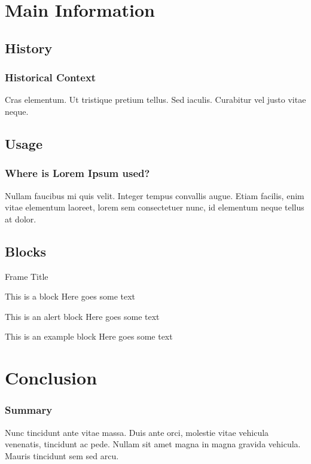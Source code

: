 \documentclass[
	11pt,
	aspectratio=169,
]{beamer}
\begin{document}
\section{Main Information}
\subsection{History}
\begin{frame}
	\frametitle{Historical Context}
	Cras elementum. Ut tristique pretium tellus. Sed iaculis. Curabitur vel justo vitae neque.
\end{frame}

\subsection{Usage}
\begin{frame}
	\frametitle{Where is Lorem Ipsum used?}
	Nullam faucibus mi quis velit. Integer tempus convallis augue. Etiam facilis, enim vitae elementum laoreet, lorem sem consectetuer nunc, id elementum neque tellus at dolor. 
\end{frame}

\subsection{Blocks}

\begin{frame}{Frame Title}
    \begin{block}{This is a block}
    Here goes some text
    \end{block}
    
    \begin{alertblock}{This is an alert block}
    Here goes some text
    \end{alertblock}
    
    \begin{exampleblock}{This is an example block}
    Here goes some text
    \end{exampleblock}
\end{frame}

\section{Conclusion}
\begin{frame}
	\frametitle{Summary}
	Nunc tincidunt ante vitae massa. Duis ante orci, molestie vitae vehicula venenatis, tincidunt ac pede. Nullam sit amet magna in magna gravida vehicula. Mauris tincidunt sem sed arcu.
\end{frame}
\end{document}
